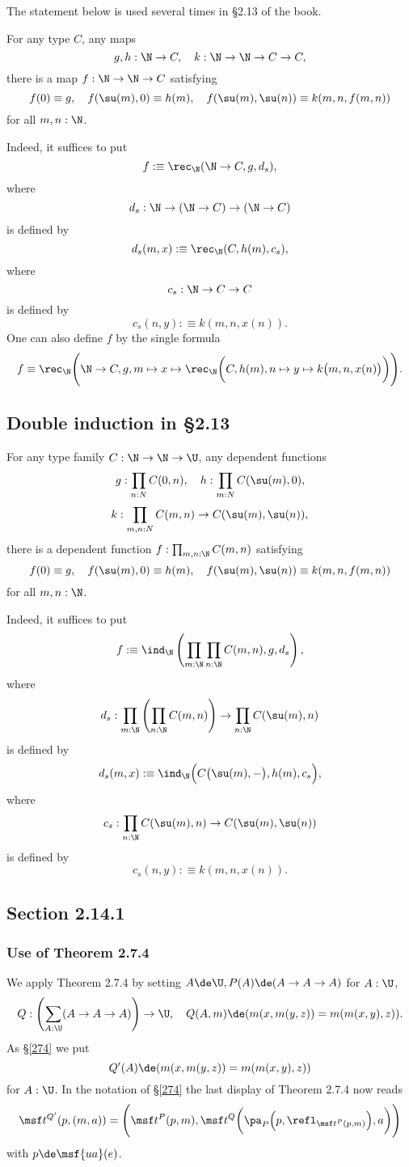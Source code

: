 \documentclass[12pt]{article}
\begin{document}
The statement below is used several times in \S2.13 of the book.

For any type $C$, any maps 
$$
g,h:\N\to C,\quad k:\N\to\N\to C\to C,
$$ 
there is a map $f:\N\to\N\to C$ satisfying 
$$
f(0)\equiv g,\quad f(\su(m),0)\equiv h(m),\quad f(\su(m),\su(n))\equiv k(m,n,f(m,n))
$$ 
for all $m,n:\N$.

Indeed, it suffices to put 
$$
f:\equiv\rec_\N(\N\to C,g,d_s),
$$ 
where 
$$
d_s:\N\to(\N\to C)\to(\N\to C)
$$ 
is defined by 
$$
d_s(m,x):\equiv\rec_\N(C,h(m),c_s),
$$ 
where 
$$
c_s:\N\to C\to C
$$ 
is defined by 
$$
c_s(n,y):\equiv k(m,n,x(n)).
$$ 
One can also define $f$ by the single formula
$$
f\equiv\rec_\N\Bigg(\N\to C,g,m\mapsto x\mapsto\rec_\N\bigg(C,h(m),n\mapsto y\mapsto k\big(m,n,x(n)\big)\bigg)\Bigg).
$$


\subsection{Double induction in \S2.13}

For any type family $C:\N\to\N\to\U$, any dependent functions
$$
g:\prod_{n:N}C(0,n),\quad h:\prod_{m:N}C(\su(m),0),
$$
$$
k:\prod_{m,n:N}C(m,n)\to C(\su(m),\su(n)),
$$ 
there is a dependent function $f:\prod_{m,n:\N}C(m,n)$ satisfying 
$$
f(0)\equiv g,\quad f(\su(m),0)\equiv h(m),\quad f(\su(m),\su(n))\equiv k(m,n,f(m,n))
$$ 
for all $m,n:\N$.

Indeed, it suffices to put 
$$
f:\equiv\ind_\N\left(\prod_{m:\N}\prod_{n:\N}C(m,n),g,d_s\right),
$$ 
where 
$$
d_s:\prod_{m:\N}\left(\prod_{n:\N}C(m,n)\right)\to\prod_{n:\N}C(\su(m),n)
$$ 
is defined by 
$$
d_s(m,x):\equiv\ind_\N\Big(C\big(\su(m),-\big),h(m),c_s\Big),
$$ 
where 
$$
c_s:\prod_{n:\N}C(\su(m),n)\to C(\su(m),\su(n))
$$ 
is defined by 
$$
c_s(n,y):\equiv k(m,n,x(n)).
$$


\subsection{Section 2.14.1}

\subsubsection{Use of Theorem 2.7.4}

We apply Theorem 2.7.4 by setting $A\de\U,P(A)\de(A\to A\to A)$ for $A:\U$, 
$$
Q:\left(\sum_{A:\U}(A\to A\to A)\right)\to\U,\quad Q(A,m)\de(m(x,m(y,z))=m(m(x,y),z)).
$$ 
As \S\ref{274} we put 
$$
Q'(A)\de(m(x,m(y,z))=m(m(x,y),z))
$$ 
for $A:\U$. In the notation of \S\ref{274} the last display of Theorem 2.7.4 now reads 
$$
\msf t^{Q'}(p,(m,a))=\Bigg(\msf t^P(p,m),\msf t^Q\bigg(\pa_P\Big(p,\refl_{\msf t^P(p,m)}\Big),a\bigg)\Bigg)
$$ 
with $p\de\msf{ua}(e)$.
\end{document}
